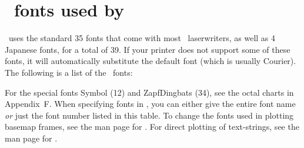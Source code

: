 %
%
\chapter{\PS\ fonts used by \gmt}
\thispagestyle{headings}

\GMT\ uses the standard 35 fonts that come with most
\PS\ laserwriters, as well as 4 Japanese fonts, for a total
of 39.  If your printer does not support
some of these fonts, it will automatically substitute the
default font (which is usually Courier).  The following is
a list of the \GMT\ fonts: \\ 


For the special fonts Symbol (12) and ZapfDingbats (34), see the
octal charts in Appendix~F.  When specifying fonts in \GMT, you can
either give the entire font name \emph{or} just the font number listed in
this table.  To change the fonts used in plotting basemap frames, see the man
page for .  For direct plotting of text-strings,
see the man page for .
